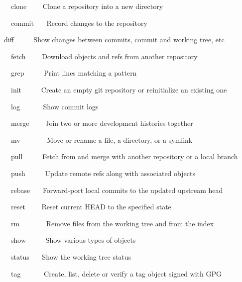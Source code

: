 \noindent 
{\fontsize{10pt}{10pt}\selectfont ~~~clone~~~~  Clone a repository into a new directory} \par
\noindent 
{\fontsize{10pt}{10pt}\selectfont ~~~commit~~~  Record changes to the repository} \par
\noindent 
{\fontsize{10pt}{10pt}\selectfont ~diff~~~~~  Show changes between commits, commit and working tree, etc} \par
\noindent 
{\fontsize{10pt}{10pt}\selectfont ~~~fetch~~~~  Download objects and refs from another repository} \par
\noindent 
{\fontsize{10pt}{10pt}\selectfont ~~~grep~~~~~  Print lines matching a pattern} \par
\noindent 
{\fontsize{10pt}{10pt}\selectfont ~~~init~~~~~  Create an empty git repository or reinitialize an existing one} \par
\noindent 
{\fontsize{10pt}{10pt}\selectfont ~~~log~~~~~~  Show commit logs} \par
\noindent 
{\fontsize{10pt}{10pt}\selectfont ~~~merge~~~~  Join two or more development histories together} \par
\noindent 
{\fontsize{10pt}{10pt}\selectfont ~~~mv~~~~~~~  Move or rename a file, a directory, or a symlink} \par
\noindent 
{\fontsize{10pt}{10pt}\selectfont ~~~pull~~~~~  Fetch from and merge with another repository or a local branch} \par
\noindent 
{\fontsize{10pt}{10pt}\selectfont ~~~push~~~~~  Update remote refs along with associated objects} \par
\noindent 
{\fontsize{10pt}{10pt}\selectfont ~~~rebase~~~  Forward-port local commits to the updated upstream head} \par
\noindent 
{\fontsize{10pt}{10pt}\selectfont ~~~reset~~~~  Reset current HEAD to the specified state} \par
\noindent 
{\fontsize{10pt}{10pt}\selectfont ~~~rm~~~~~~~  Remove files from the working tree and from the index} \par
\noindent 
{\fontsize{10pt}{10pt}\selectfont ~~~show~~~~~  Show various types of objects} \par
\noindent 
{\fontsize{10pt}{10pt}\selectfont ~~~status~~~  Show the working tree status} \par
\noindent 
{\fontsize{10pt}{10pt}\selectfont ~~~tag~~~~~~  Create, list, delete or verify a tag object signed with GPG} \par
\noindent 
\vspace{10pt}
